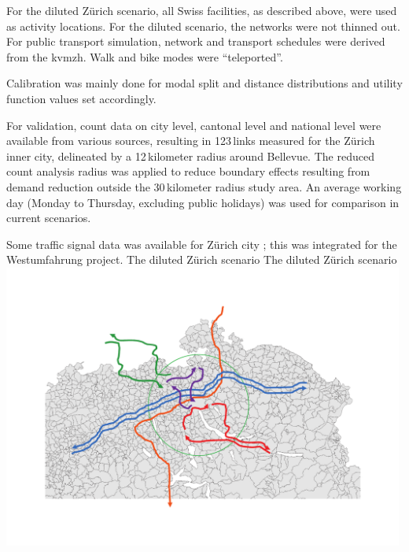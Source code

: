 For the diluted Zürich scenario, all Swiss facilities, as described above, were used as activity locations. For the diluted scenario, the networks were not thinned out. For  public transport simulation, network and transport schedules were derived from the \gls{kvmzh}. Walk and bike modes were ``\gls{teleported}''. 

Calibration was mainly done for modal split and distance distributions and utility function values set accordingly.

For validation, count data on city level, cantonal level and national level \citep[][]{ASTRA_Webpage_2006} were available from various sources, resulting in 123\,links measured for the Zürich inner city, delineated by a 12\,kilometer radius around Bellevue. The reduced count analysis radius was applied to reduce boundary effects resulting from demand reduction outside the 30\,kilometer radius study area. An average working day (Monday to Thursday, excluding public holidays) was used for comparison in current scenarios.

Some traffic signal data was available for Zürich city \citep[][]{STAPOZH-DAV_unpub_gtZH_2008}; this was integrated for the Westumfahrung project.
%
\createfigure%
{The diluted Zürich scenario}%
{The diluted Zürich scenario}%
{\label{fig:zurichScenario}}%
{\includegraphics[width=0.99\textwidth, angle=0]{scenarios/figures/zh.pdf}}%
{}

